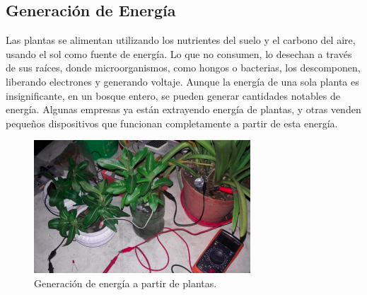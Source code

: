 \documentclass[twocolumn]{article}
\begin{document}
\subsection{Generación de Energía}
Las plantas se alimentan utilizando los nutrientes del suelo y el carbono del aire, usando el sol como fuente de energía. Lo que no consumen, lo desechan a través de sus raíces, donde microorganismos, como hongos o bacterias, los descomponen, liberando electrones y generando voltaje. Aunque la energía de una sola planta es insignificante, en un bosque entero, se pueden generar cantidades notables de energía. Algunas empresas ya están extrayendo energía de plantas, y otras venden pequeños dispositivos que funcionan completamente a partir de esta energía.
\begin{figure}[!h]
    \centering
    \includegraphics[width=\linewidth]{imagenes/Captura desde 2024-09-25 16-34-23.png}
    \caption{Generación de energía a partir de plantas.}
\end{figure}
\end{document}
